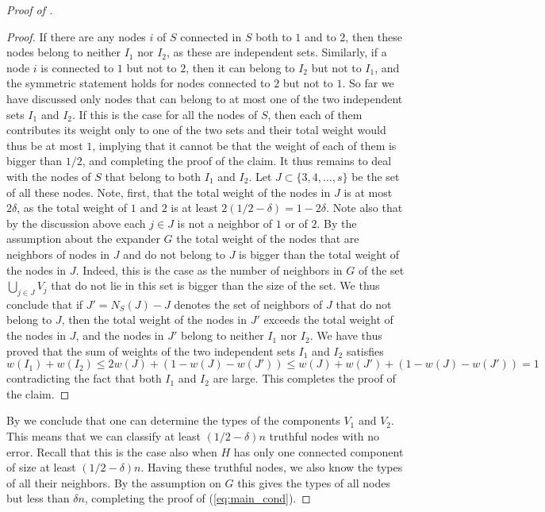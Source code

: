 \documentclass{toc}
\begin{document}
\begin{proof}[Proof of ]
\begin{proof}
  If there are any nodes $i$ of $S$ connected in $S$ both to $1$
  and to $2$, then these nodes belong to neither $I_1$ nor $I_2$,
  as these are independent sets. Similarly, if a node $i$ is
  connected to $1$ but not to $2$, then it can belong to $I_2$ but not
  to $I_1$, and the symmetric statement holds for nodes connected
  to $2$ but not to $1$. So far we have discussed only nodes that
  can belong to at most one of the two independent sets $I_1$ and
  $I_2$. If this is the case for all the nodes of $S$, then each of
  them contributes its weight only to one of the two sets and their
  total weight would thus be at most $1$, implying that it cannot be
  that the weight of each of them is bigger than $1/2$, and completing
  the proof of the claim. It thus remains to deal with the nodes of
  $S$ that belong to both $I_1$ and $I_2$.  Let
  $J \subset \{3,4, \ldots ,s\}$ be the set of all these nodes.
  Note, first, that the total weight of the nodes in $J$ is at most
  $2 \delta$, as the total weight of $1$ and $2$ is at least
  $2 (1/2-\delta)=1-2 \delta$.  Note also that by the discussion above
  each $j \in J$ is not a neighbor of $1$ or of $2$.  By the
  assumption about the expander $G$ the total weight of the nodes
  that are neighbors of nodes in $J$ and do not belong to $J$ is
  bigger than the total weight of the nodes in $J$.  Indeed, this
  is the case as the number of neighbors in $G$ of the set
  $\bigcup_{j \in J} V_j$ that do not lie in this set is bigger than the
  size of the set. We thus conclude that if $J'=N_S(J)-J$ denotes the
  set of neighbors of $J$ that do not belong to $J$, then the total
  weight of the nodes in $J'$ exceeds the total weight of the
  nodes in $J$, and the nodes in $J'$ belong to neither $I_1$
  nor $I_2$.  We have thus proved that the sum of weights of the two
  independent sets $I_1$ and $I_2$ satisfies
  \[
    w(I_1)+w(I_2) \leq 2 w(J) +(1-w(J)-w(J')) \leq w(J)+w(J')
    +(1-w(J)-w(J')) =1
  \]
  contradicting the fact that both $I_1$ and $I_2$ are large. This
  completes the proof of the claim.
\end{proof}

By  we conclude that one can determine the types of
the components $V_1$ and $V_2$. This means that we can classify
at least $(1/2-\delta)n$ truthful nodes with no error. Recall
that this is
the case also when $H$ has only one connected component of size
at least $(1/2-\delta)n$. Having these truthful nodes, we also
know the types of all their neighbors. By the assumption on $G$
this gives the types of all nodes but less than $\delta n$,
completing the proof of (\ref{eq:main_cond}).   
\vspace{0.1cm}


\end{proof}
\end{document}
